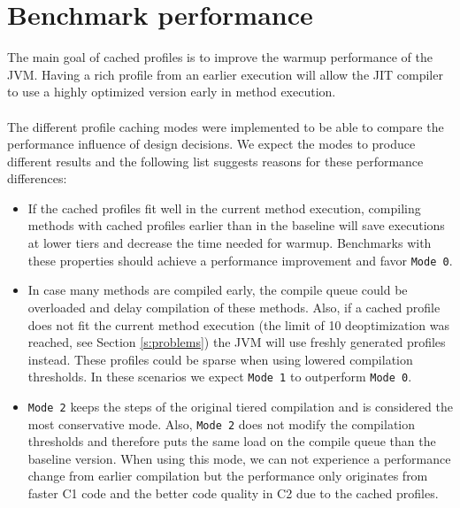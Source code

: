 \section{Benchmark performance}
\label{s:perf_benchmark}
The main goal of cached profiles is to improve the warmup performance of the JVM. Having a rich profile from an earlier execution will allow the JIT compiler to use a highly optimized version early in method execution.
\\\\
The different profile caching modes were implemented to be able to compare the performance influence of design decisions. We expect the modes to produce different results and the following list suggests reasons for these performance differences:
\begin{itemize}
  \item If the cached profiles fit well in the current method execution, compiling methods with cached profiles earlier than in the baseline will save executions at lower tiers and decrease the time needed for warmup. Benchmarks with these properties should achieve a performance improvement and favor \texttt{Mode 0}.
  \item In case many methods are compiled early, the compile queue could be overloaded and delay compilation of these methods. Also, if a cached profile does not fit the current method execution (the limit of 10 deoptimization was reached, see Section \ref{s:problems}) the JVM will use freshly generated profiles instead. These profiles could be sparse when using lowered compilation thresholds. In these scenarios we expect \texttt{Mode 1} to outperform \texttt{Mode 0}.
  \item \texttt{Mode 2} keeps the steps of the original tiered compilation and is considered the most conservative mode. Also, \texttt{Mode 2} does not modify the compilation thresholds and therefore puts the same load on the compile queue than the baseline version. When using this mode, we can not experience a performance change from earlier compilation but the performance only originates from faster C1 code and the better code quality in C2 due to the cached profiles.
\end{itemize}
